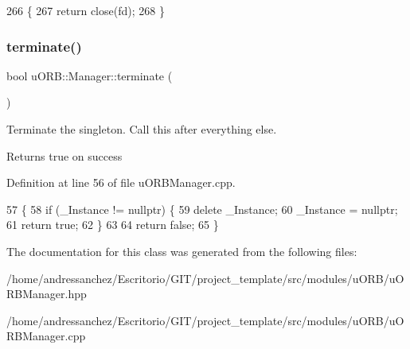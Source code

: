 \begin{DoxyCode}
266 \{
267     \textcolor{keywordflow}{return} close(fd);
268 \}
\end{DoxyCode}
\mbox{\label{classuORB_1_1Manager_a306a9970d2f7cf304fba4a918e238558}} 
\subsubsection{\texorpdfstring{terminate()}{terminate()}}
{\footnotesize\ttfamily bool u\+O\+R\+B\+::\+Manager\+::terminate (\begin{DoxyParamCaption}{ }\end{DoxyParamCaption})\hspace{0.3cm}{\ttfamily [static]}}

Terminate the singleton. Call this after everything else. \begin{DoxyReturn}{Returns}
true on success 
\end{DoxyReturn}


Definition at line 56 of file u\+O\+R\+B\+Manager.\+cpp.


\begin{DoxyCode}
57 \{
58     \textcolor{keywordflow}{if} (\_Instance != \textcolor{keyword}{nullptr}) \{
59         \textcolor{keyword}{delete} \_Instance;
60         \_Instance = \textcolor{keyword}{nullptr};
61         \textcolor{keywordflow}{return} \textcolor{keyword}{true};
62     \}
63 
64     \textcolor{keywordflow}{return} \textcolor{keyword}{false};
65 \}
\end{DoxyCode}


The documentation for this class was generated from the following files\+:\begin{DoxyCompactItemize}
\item 
/home/andressanchez/\+Escritorio/\+G\+I\+T/project\+\_\+template/src/modules/u\+O\+R\+B/u\+O\+R\+B\+Manager.\+hpp\item 
/home/andressanchez/\+Escritorio/\+G\+I\+T/project\+\_\+template/src/modules/u\+O\+R\+B/u\+O\+R\+B\+Manager.\+cpp\end{DoxyCompactItemize}
